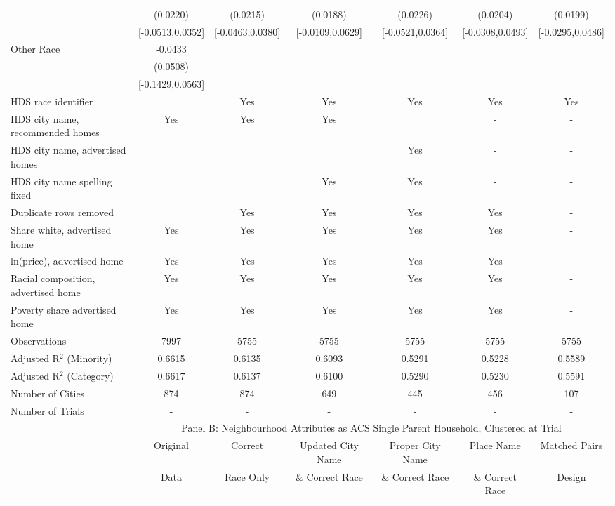 \begin{table}[htbp]
{\begin{tabular}{l*{6}{c}}
 & (0.0220) & (0.0215) & (0.0188) & (0.0226) & (0.0204) & (0.0199) \\
 & [-0.0513,0.0352] & [-0.0463,0.0380] & [-0.0109,0.0629] & [-0.0521,0.0364] & [-0.0308,0.0493] & [-0.0295,0.0486] \\
Other Race & -0.0433 &  &  &  &  &  \\
 & (0.0508) &  &  &  &  &  \\
 & [-0.1429,0.0563] &  &  &  &  &  \\
\midrule
HDS race identifier & & Yes & Yes & Yes & Yes & Yes \\
HDS city name, recommended homes & Yes & Yes & Yes & & - & -\\
HDS city name, advertised homes &  &  &  & Yes & - & -\\
HDS city name spelling fixed & & & Yes & Yes & - & -\\
Duplicate rows removed &  & Yes & Yes & Yes & Yes & - \\
\midrule
Share white, advertised home  & Yes & Yes & Yes & Yes & Yes & - \\
ln(price), advertised home  & Yes & Yes & Yes & Yes & Yes & - \\
Racial composition, advertised home & Yes & Yes & Yes & Yes & Yes & - \\
Poverty share advertised home & Yes & Yes & Yes & Yes & Yes & - \\
Observations & 7997 & 5755 & 5755 & 5755 & 5755 & 5755 \\
Adjusted R$^2$ (Minority) & 0.6615 & 0.6135 & 0.6093 & 0.5291 & 0.5228 & 0.5589 \\
Adjusted R$^2$ (Category) & 0.6617 & 0.6137 & 0.6100 & 0.5290 & 0.5230 & 0.5591 \\
Number of Cities & 874 & 874 & 649 & 445 & 456 & 107 \\
Number of Trials & - & - & - & - & - & - \\
\bottomrule
\toprule
& \multicolumn{6}{c}{Panel B: Neighbourhood Attributes as ACS Single Parent Household, Clustered at Trial}\\
\toprule
                    &\multicolumn{1}{c}{Original}&\multicolumn{1}{c}{Correct}&\multicolumn{1}{c}{Updated City Name}&\multicolumn{1}{c}{Proper City Name}&\multicolumn{1}{c}{Place Name}&\multicolumn{1}{c}{Matched Pairs}\\
                      &\multicolumn{1}{c}{Data}&\multicolumn{1}{c}{Race Only}&\multicolumn{1}{c}{\& Correct Race}&\multicolumn{1}{c}{\& Correct Race}&\multicolumn{1}{c}{\& Correct Race}&\multicolumn{1}{c}{Design}\\                  

\end{tabular}}
\end{table}
